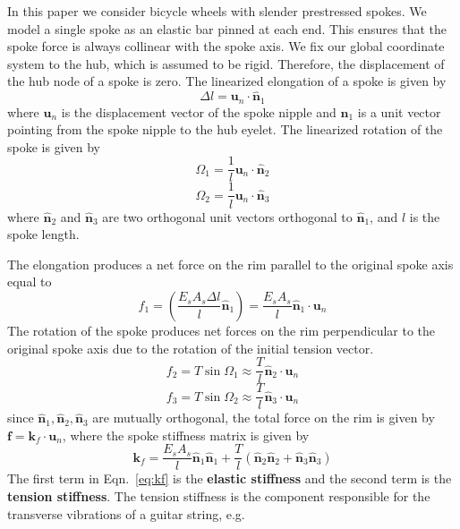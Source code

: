 \documentclass{bmd2016p}
\begin{document}
In this paper we consider bicycle wheels with slender prestressed spokes. We model a single spoke as an elastic bar pinned at each end. This ensures that the spoke force is always collinear with the spoke axis. We fix our global coordinate system to the hub, which is assumed to be rigid. Therefore, the displacement of the hub node of a spoke is zero. The linearized elongation of a spoke is given by
\begin{equation}\label{eq:selong}
\Delta l = \bm{u}_n\cdot \hat{\bm{n}}_1
\end{equation}
where $\bm{u}_n$ is the displacement vector of the spoke nipple and $\hat{\bm{n}}_1$ is a unit vector pointing from the spoke nipple to the hub eyelet. The linearized rotation of the spoke is given by
\begin{equation}\label{eq:srot1}
\Omega_1 = \frac{1}{l} \bm{u}_n\cdot \hat{\bm{n}}_2
\end{equation}
\begin{equation}\label{eq:srot2}
\Omega_2 = \frac{1}{l} \bm{u}_n\cdot \hat{\bm{n}}_3
\end{equation}
where $\hat{\bm{n}}_2$ and $\hat{\bm{n}}_3$ are two orthogonal unit vectors orthogonal to $\hat{\bm{n}}_1$, and $l$ is the spoke length.

The elongation produces a net force on the rim parallel to the original spoke axis equal to
\begin{equation}\label{eq:sF1}
f_1 = \left(\frac{E_sA_s\Delta l}{l}\hat{\bm{n}}_1\right) = \frac{E_sA_s}{l} \hat{\bm{n}}_1 \cdot \bm{u}_n 
\end{equation}
The rotation of the spoke produces net forces on the rim perpendicular to the original spoke axis due to the rotation of the initial tension vector.
\begin{equation}\label{eq:sF2}
f_2 = T \sin{\Omega_1} \approx \frac{T}{l} \hat{\bm{n}}_2 \cdot \bm{u}_n
\end{equation}
\begin{equation}\label{eq:sF3}
f_3 = T \sin{\Omega_2} \approx \frac{T}{l} \hat{\bm{n}}_3 \cdot \bm{u}_n
\end{equation}
since $\hat{\bm{n}}_1,\hat{\bm{n}}_2,\hat{\bm{n}}_3$ are mutually orthogonal, the total force on the rim is given by $\bm{f} = \bm{k}_f \cdot \bm{u}_n$, where the spoke stiffness matrix is given by
\begin{equation}\label{eq:kf}
\bm{k}_f = \frac{E_sA_s}{l}\hat{\bm{n}}_1\hat{\bm{n}}_1 + \frac{T}{l}(\hat{\bm{n}}_2\hat{\bm{n}}_2 + \hat{\bm{n}}_3\hat{\bm{n}}_3)
\end{equation}
The first term in Eqn.~\ref{eq:kf} is the {\bf elastic stiffness} and the second term is the {\bf tension stiffness}. The tension stiffness is the component responsible for the transverse vibrations of a guitar string, e.g.
\end{document}
